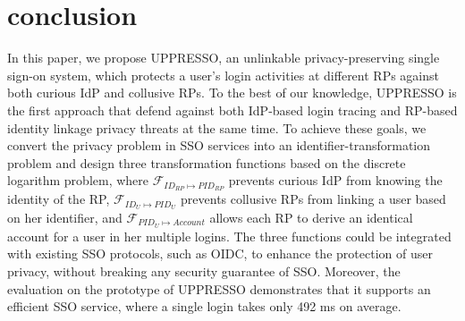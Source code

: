 \section{conclusion}
\label{sec:conclusion}
In this paper, we propose UPPRESSO, an unlinkable privacy-preserving single sign-on system, which protects a user's login activities at different RPs against both curious IdP and collusive RPs. To the best of our knowledge, UPPRESSO is the first approach that defend against both IdP-based login tracing and RP-based identity linkage privacy threats at the same time. To achieve these goals, we convert the privacy problem in SSO services into an identifier-transformation problem and design three transformation functions based on the discrete logarithm problem, where $\mathcal{F}_{ID_{RP} \mapsto PID_{RP}}$ prevents curious IdP from knowing the identity of the RP, $\mathcal{F}_{ID_{U} \mapsto PID_{U}}$ prevents collusive RPs from linking a user based on her identifier, and $\mathcal{F}_{PID_{U} \mapsto Account}$ allows each RP to derive an identical account for a user in her multiple logins. The three functions could be integrated with existing SSO protocols, such as OIDC, to enhance the protection of user privacy, without breaking any security guarantee of SSO. Moreover, the evaluation on the prototype of UPPRESSO demonstrates that it supports an efficient SSO service, where a single login takes only 492 ms on average.
